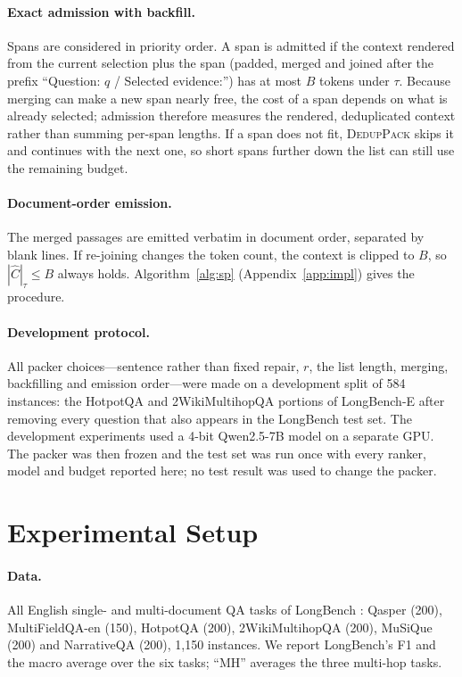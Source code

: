 \documentclass[11pt]{article}
\newcommand{\spk}{\textsc{DedupPack}}
\begin{document}
\paragraph{Exact admission with backfill.} Spans are considered in priority order. A span is admitted if the context rendered from the current selection plus the span (padded, merged and joined after the prefix ``Question: $q$ / Selected evidence:'') has at most $B$ tokens under $\tau$. Because merging can make a new span nearly free, the cost of a span depends on what is already selected; admission therefore measures the rendered, deduplicated context rather than summing per-span lengths. If a span does not fit, \spk{} skips it and continues with the next one, so short spans further down the list can still use the remaining budget.

\paragraph{Document-order emission.} The merged passages are emitted verbatim in document order, separated by blank lines. If re-joining changes the token count, the context is clipped to $B$, so $|\hat C|_\tau\le B$ always holds. Algorithm~\ref{alg:sp} (Appendix~\ref{app:impl}) gives the procedure.

\paragraph{Development protocol.}
All packer choices---sentence rather than fixed repair, $r$, the list length, merging, backfilling and emission order---were made on a development split of 584 instances: the HotpotQA and 2WikiMultihopQA portions of LongBench-E \citep{bai2023longbench} after removing every question that also appears in the LongBench test set. The development experiments used a 4-bit Qwen2.5-7B model on a separate GPU. The packer was then frozen and the test set was run once with every ranker, model and budget reported here; no test result was used to change the packer.

\section{Experimental Setup}
\label{sec:setup}

\paragraph{Data.} All English single- and multi-document QA tasks of LongBench \citep{bai2023longbench}: Qasper \citep{dasigi2021qasper} (200), MultiFieldQA-en (150), HotpotQA \citep{yang2018hotpotqa} (200), 2WikiMultihopQA \citep{ho2020constructing} (200), MuSiQue \citep{trivedi2022musique} (200) and NarrativeQA \citep{kocisky2018narrativeqa} (200), 1,150 instances. We report LongBench's F1 and the macro average over the six tasks; ``MH'' averages the three multi-hop tasks.
\end{document}
